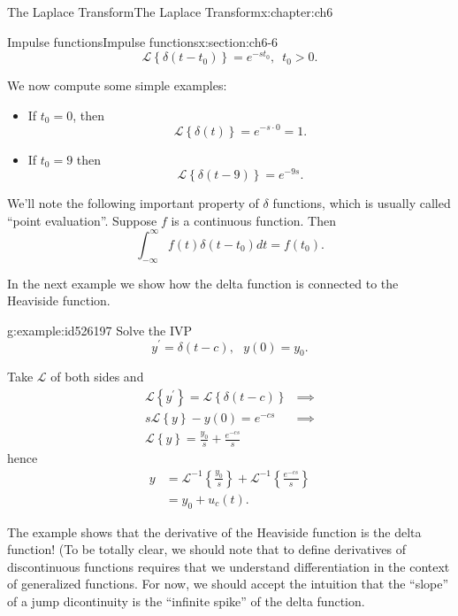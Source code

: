 \documentclass[oneside,10pt,]{book}
\numberwithin{equation}{section}
\numberwithin{equation}{section}
\newcommand{\amp}{&}
\begin{document}
\begin{chapterptx}{The Laplace Transform}{}{The Laplace Transform}{}{}{x:chapter:ch6}
\begin{sectionptx}{Impulse functions}{}{Impulse functions}{}{}{x:section:ch6-6}
\begin{equation*}
\mathcal{L}\left\{ \delta\left(t-t_{0}\right)\right\} =e^{-st_{0}},\,\,\,t_{0}>0.
\end{equation*}
%
\par
We now compute some simple examples:%
%
\begin{itemize}[label=\textbullet]
\item{}If \(t_{0}=0\), then%
\begin{equation*}
\mathcal{L}\left\{ \delta\left(t\right)\right\} =e^{-s\cdot0}=1.
\end{equation*}
%
\item{}If \(t_{0}=9\) then%
\begin{equation*}
\mathcal{L}\left\{ \delta\left(t-9\right)\right\} =e^{-9s}.
\end{equation*}
%
\end{itemize}
We'll note the following important property of \(\delta\) functions, which is usually called ``point evaluation''. Suppose \(f\) is a continuous function. Then%
\begin{equation*}
\int_{-\infty}^{\infty}f(t)\delta(t-t_{0})dt=f\left(t_{0}\right).
\end{equation*}
%
\par
In the next example we show how the delta function is connected to the Heaviside function.%
\begin{example}{}{g:example:id526197}%
Solve the IVP%
\begin{equation*}
y^{\prime}=\delta(t-c),\,\,\,\,y(0)=y_{0}.
\end{equation*}
%
\par
Take \(\mathcal{L}\) of both sides and%
\begin{align*}
\mathcal{L}\left\{ y^{\prime}\right\} =\mathcal{L}\left\{ \delta\left(t-c\right)\right\}  \amp \implies\\
s\mathcal{L}\left\{ y\right\} -y(0)=e^{-cs} \amp \implies\\
\mathcal{L}\left\{ y\right\} =\frac{y_{0}}{s}+\frac{e^{-cs}}{s}
\end{align*}
hence%
\begin{align*}
y \amp =\mathcal{L}^{-1}\left\{ \frac{y_{0}}{s}\right\} +\mathcal{L}^{-1}\left\{ \frac{e^{-cs}}{s}\right\} \\
\amp =y_{0}+u_{c}(t).
\end{align*}
%
\end{example}
The example shows that the derivative of the Heaviside function is the delta function! (To be totally clear, we should note that to define derivatives of discontinuous functions requires that we understand differentiation in the context of generalized functions. For now, we should accept the intuition that the ``slope'' of a jump dicontinuity is the ``infinite spike'' of the delta function.%

\end{sectionptx}
\end{chapterptx}
\end{document}
